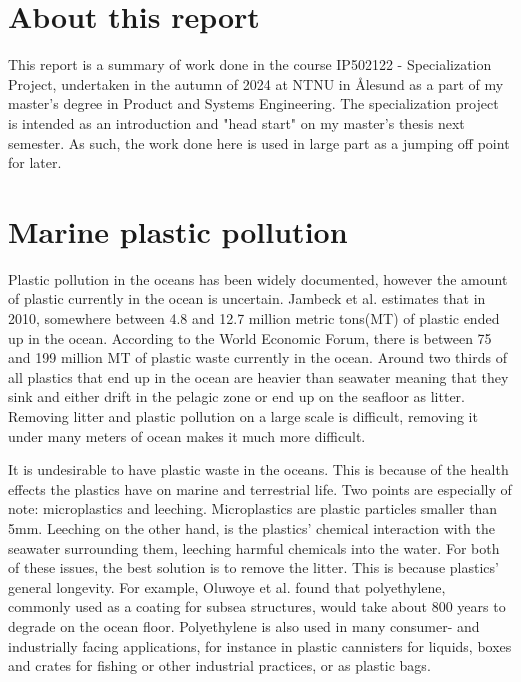 

\section{About this report}
This report is a summary of work done in the course IP502122 - Specialization Project, undertaken in the autumn of 2024 at NTNU in Ålesund as a part of my master's degree in Product and Systems Engineering. The specialization project is intended as an introduction and "head start" on my master's thesis next semester. As such, the work done here is used in large part as a jumping off point for later.

\section{Marine plastic pollution}
Plastic pollution in the oceans has been widely documented, however the amount of plastic currently in the ocean is uncertain. Jambeck et al.\cite{jambeck_plastic_2015} estimates that in 2010, somewhere between 4.8 and 12.7 million metric tons(MT) of plastic ended up in the ocean. According to the World Economic Forum\cite{world_economic_forum_top_2022}, there is between 75 and 199 million MT of plastic waste currently in the ocean. Around two thirds of all plastics that end up in the ocean are heavier than seawater \cite{isobe_fate_2022} meaning that they sink and either drift in the pelagic zone or end up on the seafloor as litter. Removing litter and plastic pollution on a large scale is difficult, removing it under many meters of ocean makes it much more difficult. 

It is undesirable to have plastic waste in the oceans. This is because of the health effects the plastics have on marine and terrestrial life. Two points are especially of note: microplastics and leeching. Microplastics are plastic particles smaller than 5mm. Leeching on the other hand, is the plastics' chemical interaction with the seawater surrounding them, leeching harmful chemicals into the water.\cite{prata_environmental_2020}\cite{zolotova_harmful_2022}\cite{segovia-mendoza_how_2020}\cite{obuzor_chemical_2023} For both of these issues, the best solution is to remove the litter. This is because plastics' general longevity. For example, Oluwoye et al. \cite{oluwoye_degradation_2023} found that polyethylene, commonly used as a coating for subsea structures, would take about 800 years to degrade on the ocean floor. Polyethylene is also used in many consumer- and industrially facing applications, for instance in plastic cannisters for liquids, boxes and crates for fishing or other industrial practices, or as plastic bags. 

